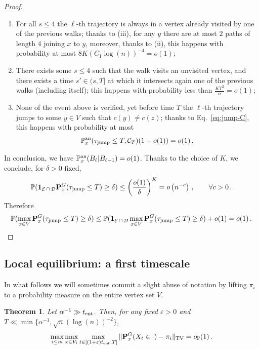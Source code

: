 \documentclass[11pt,oneside]{amsart}
\numberwithin{equation}{section}  %
\theoremstyle{plain}
\newtheorem{theorem}{Theorem}
\DeclareMathOperator{\cD}{\mathcal{D}}
\DeclareMathOperator{\cE}{\mathcal{E}}
\newcommand{\p}{\mathbb{P}}
\newcommand{\one}{\textup{\textbf{1}}}
\newcommand{\op}{o_{\p}}
\newcommand{\tent}{t_{\textup{ent}}}
\newcommand{\quenchG}{\mathbf{P}^G}
\newcommand{\pan}{\p^{\textup{an}}}
\newcommand{\tauj}{\tau_{\textup{jump}}}
\begin{document}
\begin{proof}
\begin{enumerate}
		\item[(1)] For all $s\le 4$ the ${\ell}$-th trajectory is always in a vertex already visited by one of the previous walks; thanks to (iii), for any $y$ there are at most $2$ paths of length $4$ joining $x$ to $y$, moreover, thanks to (ii), this happens with probability at most $8K(C_1\log(n))^{-4}=o(1)$;
		\item[(2)] There exists some $s\le 4$ such that the walk visits an unvisited vertex, and there exists a time $s'\in(s,T]$ at which it
             intersects again one of the previous walks (including itself); this happens with probability less than $\frac{KT^2}{n}=o(1)$;
		\item[(3)] None of the event above is verified, yet before time $T$ the ${\ell}$-th trajectory jumps to some $y\in V$ such that $c(y)\neq c(z)$; thanks to Eq.~\eqref{eq:jump-C}, this happens with probability at most $$\pan_x(\tauj\le T ,\mathcal{C}_{T})(1+o(1))=o(1)\,.$$
	\end{enumerate}
	In conclusion, we have $\pan_x(B_{\ell}|B_{{\ell}-1})=o(1)$. Thanks to the choice of $K$, we conclude, for $\delta>0$ fixed, 
	\begin{equation}
	\p(\one_{\cE\cap \cD}\quenchG_x(\tauj\le T)\ge \delta)
	\le \left(\frac{o(1)}{\delta}\right)^K 
	=o\left(n^{-c}\right)\,,\qquad\forall c>0\,.
	\end{equation}
	Therefore
	\begin{equation}
	\p(\max_{x \in V}\quenchG_x(\tauj\le T)\ge \delta)
	\le \p(\one_{\cE\cap \cD}\max_{x \in V}\quenchG_x(\tauj\le T)\ge \delta)+o(1)=o(1)\,.
	\end{equation}
\end{proof}

\subsection{Local equilibrium: a first timescale}
In what follows we will sometimes commit a slight abuse of notation by lifting $\pi_i$ to a probability measure on the entire vertex set $V$.
\begin{theorem} \label{thm:cutoff-community}
	Let $ \alpha^{-1}\gg  \tent$. Then, for any fixed $\varepsilon>0$ and $T \ll \min\{\alpha^{-1}, \sqrt{n}(\log(n))^{-2}\}$,
	\begin{equation}
	\max_{i \le m}\max_{x \in V_i}\max_{t\in[(1+\varepsilon)\tent,T]}\|\quenchG_x(X_{t}\in\cdot)-\pi_i\|_{\rm TV}=\op(1)\,.
	\end{equation}
\end{theorem}
\end{document}
